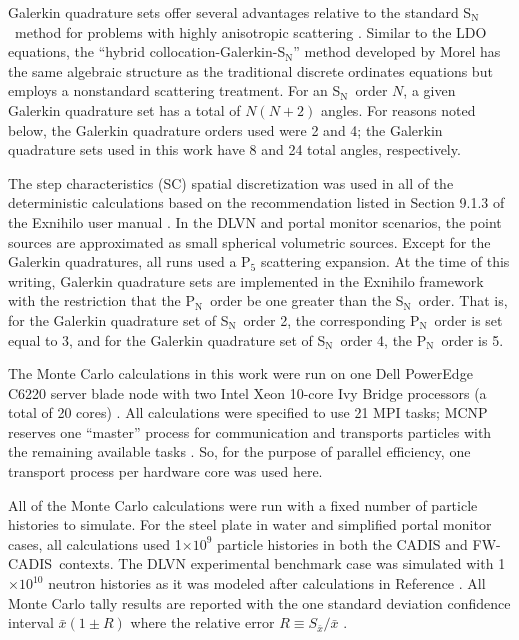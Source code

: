 \documentclass{article} %
\newcommand{\sn}{S$_\mathrm{N}$}
\newcommand{\pn}{P$_\mathrm{N}$}
\newcommand{\xbar}{\ensuremath{\bar{x}}}
\newcommand{\E}[1]{$\times10^{#1}$}
\newcommand{\fwc}{\mbox{FW-CADIS}}
\begin{document}
Galerkin quadrature sets offer several advantages relative to the standard \sn\
method for problems with highly anisotropic scattering \cite{morel}. Similar to
the LDO equations, the ``hybrid collocation-Galerkin-S$_\mathrm{N}$'' method
developed by Morel has the same algebraic structure as the traditional discrete
ordinates equations but employs a nonstandard scattering treatment. For
an \sn\ order $N$, a given Galerkin quadrature set
has a total of $N(N+2)$ angles. For reasons noted below, the Galerkin quadrature
orders used were 2 and 4; the Galerkin quadrature sets
used in this work have 8 and 24 total angles, respectively.

The step characteristics (SC) spatial discretization was used in all of the
deterministic calculations based on the recommendation listed in Section 9.1.3
of the Exnihilo user manual \cite{exum}. In the DLVN and portal monitor
scenarios, the point sources are approximated as small spherical volumetric
sources. Except for the Galerkin quadratures, all runs used a P$_5$ scattering
expansion. At the time of this writing, Galerkin quadrature sets are
implemented in the Exnihilo framework with the restriction that the \pn\ order
be one greater than the \sn\ order. That is, for the Galerkin quadrature set of
\sn\ order 2, the corresponding \pn\ order is set equal to 3, and for the
Galerkin quadrature set of \sn\ order 4, the \pn\ order is 5.

The Monte Carlo calculations in this work were run on one Dell PowerEdge C6220
server blade node with two Intel Xeon 10-core Ivy Bridge processors (a total of
20 cores) \cite{savio}. All calculations were specified to use 21 MPI tasks; MCNP
reserves one ``master'' process for communication and transports particles with
the remaining available tasks \cite{mcnp}. So, for the purpose of parallel
efficiency, one transport process per hardware core was used here.

All of the Monte Carlo calculations were run with a fixed number of particle 
histories to simulate. For the steel plate in water and simplified portal 
monitor cases, all calculations used 1\E{9} particle histories in both the
CADIS and \fwc\ contexts. The DLVN experimental benchmark case was simulated 
with 1\E{10} neutron histories as it was modeled after calculations in
Reference \cite{sw-dlvn}. All Monte Carlo tally results are reported with the
one standard deviation confidence interval $\xbar(1\pm R)$ where the relative
error $R \equiv S_{\xbar}/\xbar$ \cite{mcnp}.
\end{document}

